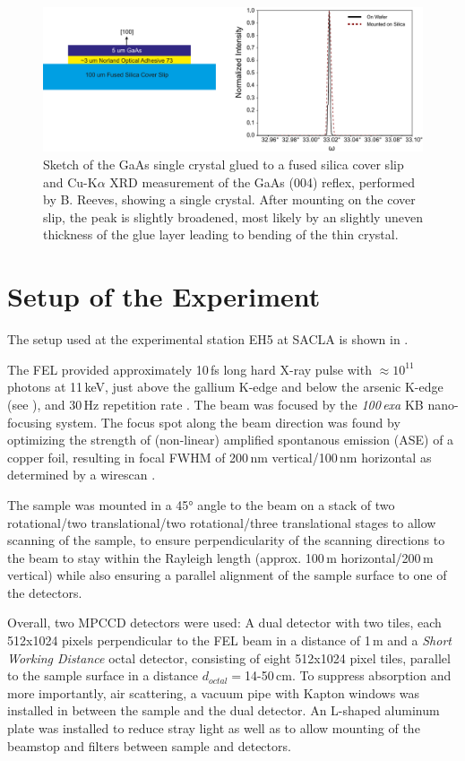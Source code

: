 \begin{figure}[tp]
	\centering
	\includegraphics[width=0.8\linewidth]{images/gaas_sample.pdf}
	\caption[GaAs sample]{Sketch of the GaAs single crystal glued to a fused silica cover slip and Cu-K$\alpha$ XRD measurement of the GaAs (004) reflex, performed by B. Reeves, showing a single crystal. After mounting on the cover slip, the peak is slightly broadened, most likely by an slightly uneven thickness of the glue layer  leading to bending of the thin crystal.}
	\label{fig:gaas_sample}
\end{figure}

\FloatBarrier
\section{Setup of the Experiment}
The setup used at the experimental station EH5 at SACLA is shown in . 

The FEL provided approximately 10\,fs long hard X-ray pulse with $\approx 10^{11}$ photons at 11\,keV, just above the gallium K-edge and below the arsenic K-edge (see ), and 30\,Hz repetition rate \cite{tono2013}. The beam was focused by the \textit{100\,exa} KB nano-focusing system. The focus spot along the beam direction was found by optimizing the strength of (non-linear) amplified spontanous emission (ASE) of a copper foil, resulting in focal FWHM of 200\,nm vertical/100\,nm horizontal as determined by a wirescan \cite{yumoto2020,handa2010,yoneda2015}.

The sample was mounted in a 45° angle to the beam on a stack of two rotational/two translational/two rotational/three translational stages to allow scanning of the sample, to ensure perpendicularity of the scanning directions to the beam to stay within the Rayleigh length (approx. 100\,\textmu m horizontal/200\,\textmu m vertical) while also ensuring a parallel alignment of the sample surface to one of the detectors. 

Overall, two MPCCD detectors were used: A dual detector with two tiles, each 512x1024 pixels perpendicular to the FEL beam in a distance of 1\,m and a \textit{Short Working Distance} octal detector, consisting of eight 512x1024 pixel tiles, parallel to the sample surface in a distance $d_{octal}=$14-50\,cm. To suppress absorption and more importantly, air scattering, a vacuum pipe with Kapton windows was installed in between the sample and the dual detector.
An L-shaped aluminum plate was installed to reduce stray light as well as to allow mounting of the beamstop and filters between sample and detectors.

